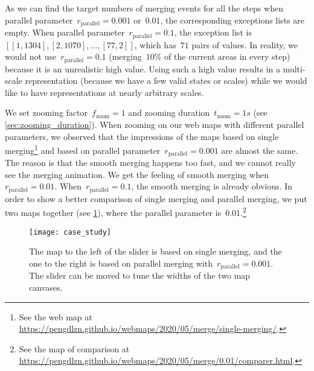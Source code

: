 \documentclass[]{interact}
\begin{document}
As we can find the target numbers of merging events for all the steps
when parallel parameter~$r_\mathrm{parallel}= 0.001$ or~$0.01$, 
the corresponding exceptions lists are empty.
When parallel parameter~$r_\mathrm{parallel}= 0.1$,
the exception list is~$[[1, 1304], [2, 1070], \dots, [77, 2]]$,
which has~$71$ pairs of values.
In reality, we would not use~$r_\mathrm{parallel}= 0.1$
(merging~$10\%$ of the current areas in every step)
because it is an unrealistic high value.
Using such a high value results in a multi-scale representation
(because we have a few valid states or scales)
while we would like to have representations at nearly
arbitrary scales.

We set zooming factor~$f_\mathrm{zoom}=1$ and 
zooming duration~$t_\mathrm{zoom}=1 s$ 
(see \sect\ref{sec:zooming_duration}).
When zooming on our web maps with different parallel parameters,
we observed that the impressions of the maps 
based on single merging\footnote{%
See the web map at
\url{https://pengdlzn.github.io/webmaps/2020/05/merge/single-merging/}.} 
and based on parallel parameter~$r_\mathrm{parallel}= 0.001$ 
are almost the same.
The reason is that the smooth merging happens too fast,
and we cannot really see the merging animation.
We get the feeling of smooth merging when~$r_\mathrm{parallel}= 0.01$.
When~$r_\mathrm{parallel}= 0.1$, the smooth merging is already obvious.
In order to show a better comparison of single merging 
and parallel merging,
we put two maps together (see \fig\ref{fig:comparison}),
where the parallel parameter is~$0.01$.\footnote{%
See the map of comparison at
\url{https://pengdlzn.github.io/webmaps/2020/05/merge/0.01/comparer.html}.}  


\begin{figure}[tb]
\centering
\texttt{[image: case\_study]}
\caption{
    The map to the left of the slider is based on single merging,
    and the one to the right is based on parallel merging
    with~$r_\mathrm{parallel}= 0.001$.
    The slider can be moved to tune the widths of the two map canvases.
}
\label{fig:comparison}
\end{figure}
\end{document}
